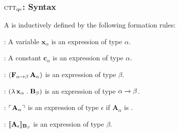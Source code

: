 \documentclass[t,12pt,numbers,fleqn]{beamer}
\newcommand{\churchqe}{$\mbox{\sc ctt}_{\rm qe}$}
\begin{document}
\begin{frame}
\frametitle{{\churchqe}: Syntax}
\bi

  \item A  is inductively defined
    by the following formation rules:

  \be

    \item {}: A variable $\textbf{x}_\alpha$ is an
      expression of type $\alpha$.

    \item {}: A constant $\textbf{c}_\alpha$ is an
      expression of type $\alpha$.

    \item {}: $(\textbf{F}_{\alpha \rightarrow
      \beta} \, \textbf{A}_\alpha)$ is an expression of type $\beta$.

    \item {}: $(\lambda\, \textbf{x}_\alpha
      \mathrel. \textbf{B}_\beta)$ is an expression of type $\alpha
      \rightarrow \beta$.

    \item {}: $\ulcorner\textbf{A}_\alpha\urcorner$ is an
      expression of type $\epsilon$ if $\textbf{A}_\alpha$ is
      .

    \item {}: $\llbracket\textbf{A}_\epsilon\rrbracket_{{\bf
        B}_\beta}$ is an expression of type $\beta$.

  \ee 

\medskip

  \item {}

\ei
\end{frame}

\end{document}
